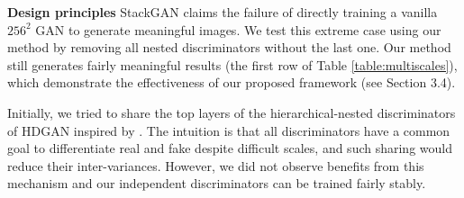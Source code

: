 \documentclass[10pt,twocolumn,letterpaper]{article}
\begin{document}



\textbf{Design principles} StackGAN claims the failure of directly training a vanilla $256^2$ GAN to generate meaningful images. 
We test this extreme case using our method by removing all nested discriminators without the last one. Our method still generates fairly meaningful results (the first row of Table \ref{table:multiscales}), which demonstrate the effectiveness of our proposed framework (see Section 3.4).

Initially, we tried to share the top layers of the hierarchical-nested discriminators of HDGAN inspired by \cite{liu2017unsupervised}. The intuition is that all discriminators have a common goal to differentiate real and fake despite difficult scales, and such sharing would reduce their inter-variances. 
However, we did not observe benefits from this mechanism and our independent discriminators can be trained fairly stably. 
\end{document}
